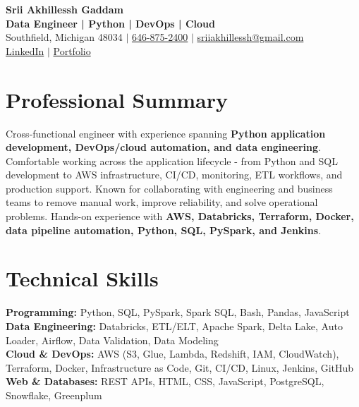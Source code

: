 \documentclass[letterpaper,10pt]{article}
\begin{document}
\fontsize{9.35pt}{10.45pt}\selectfont

\begin{center}
    {\LARGE \textbf{Srii Akhillessh Gaddam}} \\[-1pt]
    \textbf{Data Engineer | Python | DevOps | Cloud} \\[2pt]
    Southfield, Michigan 48034 $|$
    \href{tel:6468752400}{646-875-2400} $|$
    \href{mailto:sriiakhillessh@gmail.com}{sriiakhillessh@gmail.com} \\[1pt]
    \href{https://www.linkedin.com/in/srii-akhiilessh-gaddam-b48668191/}{LinkedIn} $|$
    \href{https://sriiakhillesshg.github.io/portfolio/}{Portfolio}
\end{center}
\vspace{-8pt}

\section{Professional Summary}
\small{Cross-functional engineer with experience spanning \textbf{Python application development, DevOps/cloud automation, and data engineering}. Comfortable working across the application lifecycle - from Python and SQL development to AWS infrastructure, CI/CD, monitoring, ETL workflows, and production support. Known for collaborating with engineering and business teams to remove manual work, improve reliability, and solve operational problems. Hands-on experience with \textbf{AWS, Databricks, Terraform, Docker, data pipeline automation, Python, SQL, PySpark, and Jenkins}.}

\section{Technical Skills}
\small{
\textbf{Programming:} Python, SQL, PySpark, Spark SQL, Bash, Pandas, JavaScript \\
\textbf{Data Engineering:} Databricks, ETL/ELT, Apache Spark, Delta Lake, Auto Loader, Airflow, Data Validation, Data Modeling \\
\textbf{Cloud \& DevOps:} AWS (S3, Glue, Lambda, Redshift, IAM, CloudWatch), Terraform, Docker, Infrastructure as Code, Git, CI/CD, Linux, Jenkins, GitHub \\
\textbf{Web \& Databases:} REST APIs, HTML, CSS, JavaScript, PostgreSQL, Snowflake, Greenplum
}
\end{document}
